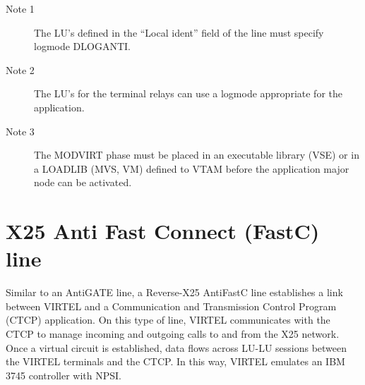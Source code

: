 \documentclass[letterpaper,10pt,english]{sphinxmanual}
\begin{document}
\begin{sphinxVerbatim}[commandchars=\\\{\}]
  
  
  
  
\end{sphinxVerbatim}

\begin{description}
\item[{Note 1}] \leavevmode
The LU’s defined in the “Local ident” field of the line must specify logmode DLOGANTI.

\item[{Note 2}] \leavevmode
The LU’s for the terminal relays can use a logmode appropriate for the application.

\item[{Note 3}] \leavevmode
The MODVIRT phase must be placed in an executable library (VSE) or in a LOADLIB (MVS, VM) defined to VTAM before the application major node can be activated.

\end{description}

\newpage

\ignorespaces 

\section{X25 Anti Fast Connect (FastC) line}
\label{\detokenize{connectivity_guide:x25-anti-fast-connect-fastc-line}}\label{\detokenize{connectivity_guide:index-78}}
Similar to an AntiGATE line, a Reverse-X25 AntiFastC line establishes a link between VIRTEL and a Communication and Transmission Control Program (CTCP) application. On this type of   line, VIRTEL communicates with the CTCP to manage incoming and outgoing calls to and from the X25 network. Once a virtual circuit is established, data flows across LU-LU sessions between the VIRTEL terminals and the CTCP. In this way, VIRTEL emulates an IBM 3745 controller with NPSI.
\end{document}
